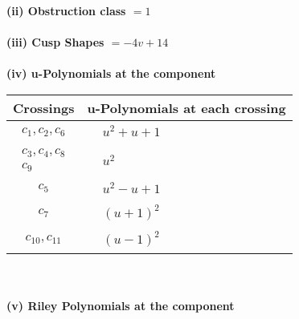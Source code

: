 \documentclass[1p]{elsarticle_modified}
\theoremstyle{definition}
\begin{document}
\flushleft \textbf{(ii) Obstruction class $= 1$}\\~\\
\flushleft \textbf{(iii) Cusp Shapes $= -4 v+14$}\\~\\
\newpage\renewcommand{\arraystretch}{1}
\flushleft \textbf{(iv) u-Polynomials at the component}\newline \\
\begin{tabular}{m{50pt}|m{274pt}}
Crossings & \hspace{64pt}u-Polynomials at each crossing \\
\hline $$\begin{aligned}c_{1},c_{2},c_{6}\end{aligned}$$&$\begin{aligned}
&u^2+u+1
\end{aligned}$\\
\hline $$\begin{aligned}c_{3},c_{4},c_{8}\\c_{9}\end{aligned}$$&$\begin{aligned}
&u^2
\end{aligned}$\\
\hline $$\begin{aligned}c_{5}\end{aligned}$$&$\begin{aligned}
&u^2- u+1
\end{aligned}$\\
\hline $$\begin{aligned}c_{7}\end{aligned}$$&$\begin{aligned}
&(u+1)^2
\end{aligned}$\\
\hline $$\begin{aligned}c_{10},c_{11}\end{aligned}$$&$\begin{aligned}
&(u-1)^2
\end{aligned}$\\
\hline
\end{tabular}\\~\\
\newpage\renewcommand{\arraystretch}{1}
\flushleft \textbf{(v) Riley Polynomials at the component}\newline \\
\end{document}
